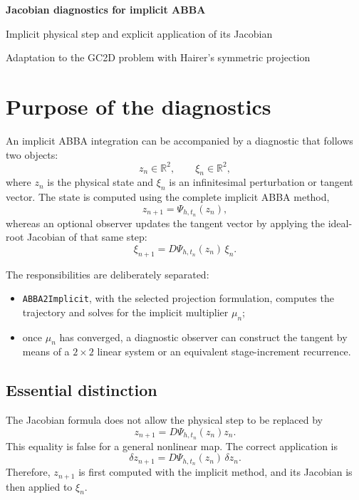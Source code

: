 \documentclass[11pt,a4paper]{article}
\newcommand{\R}{\mathbb{R}}
\begin{document}
\begin{center}
  {\LARGE\bfseries\color{azul}Jacobian diagnostics for implicit ABBA}\par
  \vspace{0.35em}
  {\large Implicit physical step and explicit application of its Jacobian}\par
  \vspace{0.45em}
  {\small Adaptation to the GC2D problem with Hairer's symmetric projection}
\end{center}

\vspace{0.5em}

\section{Purpose of the diagnostics}

An implicit ABBA integration can be accompanied by a diagnostic that follows two
objects:
\[
 z_n\in\R^2,
 \qquad
 \xi_n\in\R^2,
\]
where $z_n$ is the physical state and $\xi_n$ is an infinitesimal perturbation or tangent
vector. The state is computed using the complete implicit ABBA method,
\[
 z_{n+1}=\Psi_{h,t_n}(z_n),
\]
whereas an optional observer updates the tangent vector by applying the ideal-root
Jacobian of that same step:
\[
 \boxed{
 \xi_{n+1}=D\Psi_{h,t_n}(z_n)\,\xi_n.
 }
\]

The responsibilities are deliberately separated:
\begin{itemize}
 \item \texttt{ABBA2Implicit}, with the selected projection formulation, computes the trajectory and
       solves for the implicit multiplier $\mu_n$;
 \item once $\mu_n$ has converged, a diagnostic observer can construct the tangent by
       means of a $2\times2$ linear system or an equivalent stage-increment recurrence.
\end{itemize}

\subsection*{Essential distinction}

The Jacobian formula does not allow the physical step to be replaced by
\[
 z_{n+1}=D\Psi_{h,t_n}(z_n)z_n.
\]
This equality is false for a general nonlinear map. The correct application is
\[
 \delta z_{n+1}=D\Psi_{h,t_n}(z_n)\,\delta z_n.
\]
Therefore, $z_{n+1}$ is first computed with the implicit method, and its Jacobian is then
applied to $\xi_n$.
\end{document}
